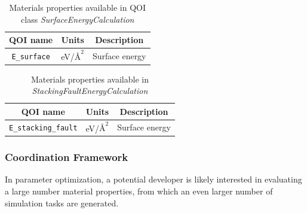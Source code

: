 \begin{table}[ht]
	\centering
	\caption{Materials properties available in QOI class \emph{SurfaceEnergyCalculation}}
	\label{tbl:pypospack_qoi_lmps_surface_energy}
	\begin{tabular}{ccc}
		\hline
		QOI name & Units & Description \\
		\hline
		\verb|E_surface|
		  & eV/$\text{\AA}^2$
			& Surface energy \\
		\hline
	\end{tabular}
\end{table}

\begin{table}[ht]
	\centering
	\caption{Materials properties available in \emph{StackingFaultEnergyCalculation}}
	\label{tbl:pypospack_qoi_lmps_stacking_fault}
	\begin{tabular}{ccc}
		\hline
		QOI name & Units & Description \\
		\hline
		\verb|E_stacking_fault|
		& eV/$\text{\AA}^2$
		& Surface energy \\
		\hline
	\end{tabular}
\end{table}

\subsubsection{Coordination Framework}

In parameter optimization, a potential developer is likely interested in evaluating a large number material properties, from which an even larger number of simulation tasks are generated.

